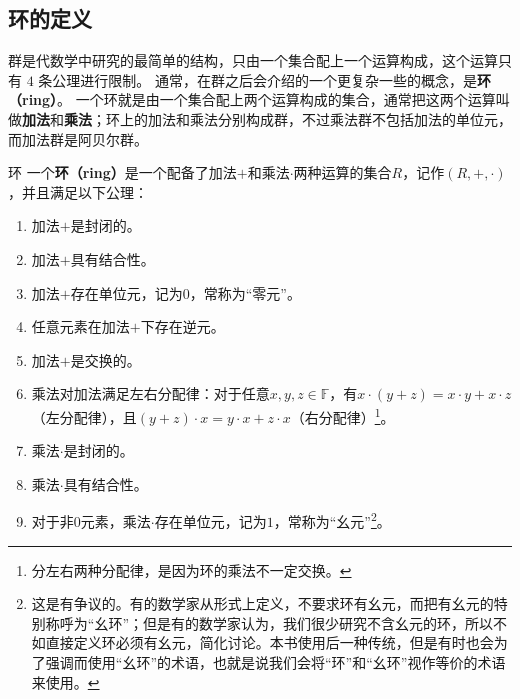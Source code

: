 


\subsection{环的定义}
群是代数学中研究的最简单的结构，只由一个集合配上一个运算构成，这个运算只有 $4$ 条公理进行限制。 通常，在群之后会介绍的一个更复杂一些的概念，是\textbf{环（ring）}。 一个环就是由一个集合配上两个运算构成的集合，通常把这两个运算叫做\textbf{加法}和\textbf{乘法}；环上的加法和乘法分别构成群，不过乘法群不包括加法的单位元，而加法群是阿贝尔群。




\begin{definition}{环}\label{def_Ring_2}
一个\textbf{环（ring）}是一个配备了加法$+$和乘法$\cdot$两种运算的集合$R$，记作$(R, +, \cdot)$，并且满足以下公理：
\begin{enumerate}
    \item 加法$+$是封闭的。
    \item 加法$+$具有结合性。
    \item 加法$+$存在单位元，记为$0$，常称为“零元”。
    \item 任意元素在加法$+$下存在逆元。
    \item 加法$+$是交换的。
    \item 乘法对加法满足左右分配律：对于任意$x, y, z\in \mathbb{F}$，有$x\cdot(y+z)=x\cdot y+x\cdot z$（左分配律），且$(y+z)\cdot x=y\cdot x+z\cdot x$（右分配律）\footnote{分左右两种分配律，是因为环的乘法不一定交换。}。
    \item 乘法$\cdot$是封闭的。
    \item 乘法$\cdot$具有结合性。
    \item 对于非$0$元素，乘法$\cdot$存在单位元，记为$1$，常称为“幺元”\footnote{这是有争议的。有的数学家从形式上定义，不要求环有幺元，而把有幺元的特别称呼为“幺环”；但是有的数学家认为，我们很少研究不含幺元的环，所以不如直接定义环必须有幺元，简化讨论。本书使用后一种传统，但是有时也会为了强调而使用“幺环”的术语，也就是说我们会将“环”和“幺环”视作等价的术语来使用。}。
    \end{enumerate}
\end{definition}

